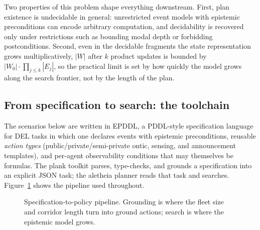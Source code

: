 \documentclass[11pt,a4paper]{article}
\theoremstyle{definition}
\begin{document}
Two properties of this problem shape everything downstream. First, plan
existence is undecidable in general: unrestricted event models with epistemic
preconditions can encode arbitrary computation, and decidability is recovered
only under restrictions such as bounding modal depth or forbidding
postconditions. Second, even in the decidable fragments the state
representation grows multiplicatively, $|W|$ after $k$ product updates is
bounded by $|W_0|\cdot\prod_{j\le k}|E_j|$, so the practical limit is set by
how quickly the model grows along the search frontier, not by the length of the
plan.

\subsection{From specification to search: the toolchain}

The scenarios below are written in EPDDL, a PDDL-style specification language
for DEL tasks in which one declares events with epistemic preconditions,
reusable \emph{action types} (public/private/semi-private ontic, sensing, and
announcement templates), and per-agent observability conditions that may
themselves be formulas. The \textsf{plank} toolkit parses, type-checks, and
grounds a specification into an explicit JSON task; the \textsf{aletheia}
planner reads that task and searches. Figure~\ref{fig:pipeline} shows the
pipeline used throughout.

\begin{figure}[H]
\centering
{}
\caption{Specification-to-policy pipeline. Grounding is where the fleet size
and corridor length turn into ground actions; search is where the epistemic
model grows.}
\label{fig:pipeline}
\end{figure}
\end{document}
